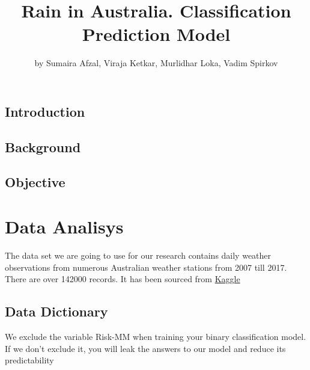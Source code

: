 \title{Rain in Australia. Classification Prediction Model}
\author{by Sumaira Afzal, Viraja Ketkar, Murlidhar Loka, Vadim Spirkov}

\maketitle



\hypertarget{introduction}{%
\subsection{Introduction}\label{introduction}}

\hypertarget{background}{%
\subsection{Background}\label{background}}

\hypertarget{objective}{%
\subsection{Objective}\label{objective}}

\hypertarget{data-analisys}{%
\section{Data Analisys}\label{data-analisys}}

The data set we are going to use for our research contains daily weather
observations from numerous Australian weather stations from 2007 till
2017. There are over 142000 records. It has been sourced from
\href{https://www.kaggle.com/jsphyg/weather-dataset-rattle-package}{Kaggle}

\hypertarget{data-dictionary}{%
\subsection{Data Dictionary}\label{data-dictionary}}

We exclude the variable Risk-MM when training your binary classification
model. If we don't exclude it, you will leak the answers to our model
and reduce its predictability

